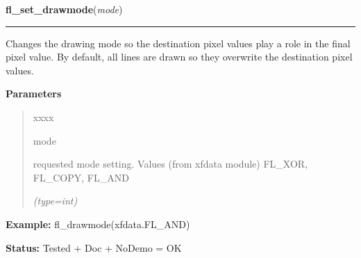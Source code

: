 \hspace{.8\funcindent}\begin{boxedminipage}{\funcwidth}

    \raggedright \textbf{fl\_set\_drawmode}(\textit{mode})

    \vspace{-1.5ex}

    \rule{\textwidth}{0.5\fboxrule}
\setlength{\parskip}{2ex}
    Changes the drawing mode so the destination pixel values play a role in
    the final pixel value. By default, all lines are drawn so they 
    overwrite the destination pixel values.

\setlength{\parskip}{1ex}
      \textbf{Parameters}
      \vspace{-1ex}

      \begin{quote}
        \begin{Ventry}{xxxx}

          \item[mode]

          requested mode setting. Values (from xfdata module) FL\_XOR, 
          FL\_COPY, FL\_AND

            {\it (type=int)}

        \end{Ventry}

      \end{quote}

\textbf{Example:} fl\_drawmode(xfdata.FL\_AND)



\textbf{Status:} Tested + Doc + NoDemo = OK



    \end{boxedminipage}

    \label{xformslib:flxbasic:fl_oval}

    \vspace{0.5ex}

